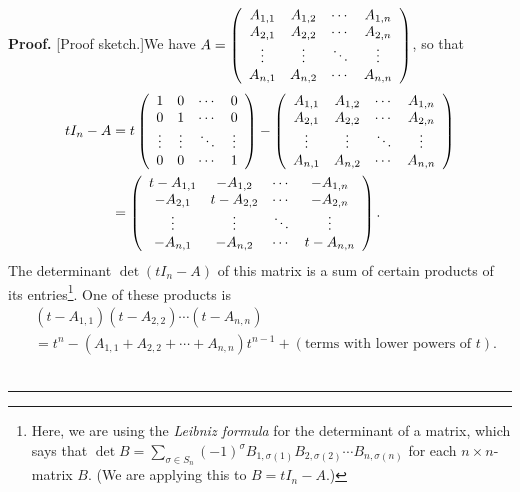 \documentclass[numbers=enddot,12pt,final,onecolumn,notitlepage]{scrartcl}%
\numberwithin{exer}{subsection}
\theoremstyle{definition}
\newenvironment{proof}[1][Proof]{\noindent\textbf{#1.} }{\ \rule{0.5em}{0.5em}}
\let\sumnonlimits\sum
\renewcommand{\sum}{\sumnonlimits\limits}
\begin{document}
\begin{proof}
[Proof sketch.]We have $A=\left(
\begin{array}
[c]{cccc}%
A_{1,1} & A_{1,2} & \cdots & A_{1,n}\\
A_{2,1} & A_{2,2} & \cdots & A_{2,n}\\
\vdots & \vdots & \ddots & \vdots\\
A_{n,1} & A_{n,2} & \cdots & A_{n,n}%
\end{array}
\right)  $, so that%
\begin{align*}
tI_{n}-A  &  =t\left(
\begin{array}
[c]{cccc}%
1 & 0 & \cdots & 0\\
0 & 1 & \cdots & 0\\
\vdots & \vdots & \ddots & \vdots\\
0 & 0 & \cdots & 1
\end{array}
\right)  -\left(
\begin{array}
[c]{cccc}%
A_{1,1} & A_{1,2} & \cdots & A_{1,n}\\
A_{2,1} & A_{2,2} & \cdots & A_{2,n}\\
\vdots & \vdots & \ddots & \vdots\\
A_{n,1} & A_{n,2} & \cdots & A_{n,n}%
\end{array}
\right) \\
&  =\left(
\begin{array}
[c]{cccc}%
t-A_{1,1} & -A_{1,2} & \cdots & -A_{1,n}\\
-A_{2,1} & t-A_{2,2} & \cdots & -A_{2,n}\\
\vdots & \vdots & \ddots & \vdots\\
-A_{n,1} & -A_{n,2} & \cdots & t-A_{n,n}%
\end{array}
\right)  .
\end{align*}
The determinant $\det\left(  tI_{n}-A\right)  $ of this matrix is a sum of
certain products of its entries\footnote{Here, we are using the \emph{Leibniz
formula} for the determinant of a matrix, which says that $\det B=\sum
_{\sigma\in S_{n}}\left(  -1\right)  ^{\sigma}B_{1,\sigma\left(  1\right)
}B_{2,\sigma\left(  2\right)  }\cdots B_{n,\sigma\left(  n\right)  }$ for each
$n\times n$-matrix $B$. (We are applying this to $B=tI_{n}-A$.)}. One of these
products is%
\begin{align*}
&  \left(  t-A_{1,1}\right)  \left(  t-A_{2,2}\right)  \cdots\left(
t-A_{n,n}\right) \\
&  =t^{n}-\left(  A_{1,1}+A_{2,2}+\cdots+A_{n,n}\right)  t^{n-1}+\left(
\text{terms with lower powers of }t\right)  .

\end{align*}
\end{proof}
\end{document}
